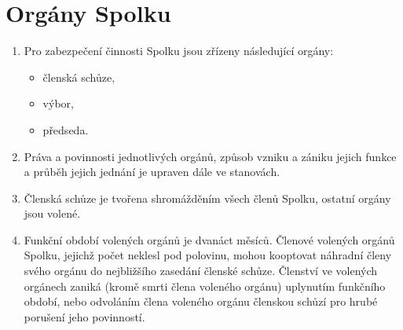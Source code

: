 \documentclass[11pt,a4paper]{article}
\begin{document}
\section{Orgány Spolku}
\begin{enumerate}[itemsep=0pt]
    \item  Pro zabezpečení činnosti Spolku jsou zřízeny následující orgány: 
    \begin{itemize}[itemsep=0pt,topsep=0pt]
        \item členská schůze,
        \item výbor,
        \item předseda.
    \end{itemize}
    \item Práva a povinnosti jednotlivých orgánů, způsob vzniku a zániku jejich 
    funkce a průběh jejich jednání je upraven dále ve stanovách.
    \item Členská schůze je tvořena shromážděním všech členů Spolku, ostatní 
    orgány jsou volené.
    \item Funkční období volených orgánů je dvanáct měsíců. Členové volených 
    orgánů Spolku, jejichž počet neklesl pod polovinu, mohou kooptovat náhradní 
    členy svého orgánu do nejbližšího zasedání členské schůze. Členství 
    ve volených orgánech zaniká (kromě smrti člena voleného orgánu) uplynutím 
    funkčního období, nebo odvoláním člena voleného orgánu členskou schůzí 
    pro hrubé porušení jeho povinností.
\end{enumerate}
\end{document}
